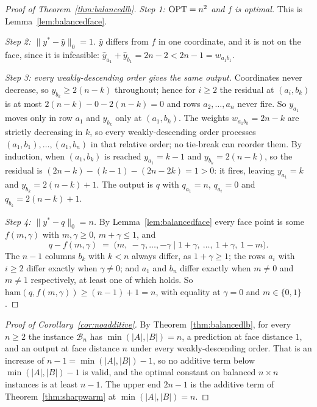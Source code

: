 \begin{proof}[Proof of Theorem~\ref{thm:balancedlb}]
\emph{Step 1: $\mathrm{OPT} = n^2$ and $f$ is optimal.} This is Lemma~\ref{lem:balancedface}.

\emph{Step 2: $\|y^*-\hat y\|_0 = 1$.} $\hat y$ differs from $f$ in one coordinate, and it is not
on the face, since it is infeasible: $\hat y_{a_1} + \hat y_{b_1} = 2n-2 < 2n-1 = w_{a_1 b_1}$.

\emph{Step 3: every weakly-descending order gives the same output.} Coordinates never decrease, so
$y_{b_k} \ge 2(n-k)$ throughout; hence for $i \ge 2$ the residual at $(a_i,b_k)$ is at most
$2(n-k) - 0 - 2(n-k) = 0$ and rows $a_2,\dots,a_n$ never fire. So $y_{a_1}$ moves only in row $a_1$
and $y_{b_k}$ only at $(a_1,b_k)$. The weights $w_{a_1 b_k} = 2n-k$ are strictly decreasing
in $k$, so every weakly-descending order processes $(a_1,b_1),\dots,(a_1,b_n)$ in that relative
order; no tie-break can reorder them. By induction, when $(a_1,b_k)$ is reached $y_{a_1} = k-1$
and $y_{b_k} = 2(n-k)$, so the residual is $(2n-k)-(k-1)-(2n-2k) = 1 > 0$: it fires, leaving
$y_{a_1} = k$ and $y_{b_k} = 2(n-k)+1$. The output is $q$ with $q_{a_1} = n$, $q_{a_i} = 0$ and
$q_{b_k} = 2(n-k)+1$.

\emph{Step 4: $\|y^*-q\|_0 = n$.} By Lemma~\ref{lem:balancedface} every face point is some
$f(m,\gamma)$ with $m, \gamma \ge 0$, $m + \gamma \le 1$, and
\[
  q - f(m,\gamma) \;=\; \bigl(m,\ -\gamma, \dots, -\gamma \;\big|\; 1+\gamma,\ \dots,\ 1+\gamma,\ 1-m\bigr).
\]
The $n-1$ columns $b_k$ with $k < n$ always differ, as $1 + \gamma \ge 1$; the rows $a_i$ with
$i \ge 2$ differ exactly when $\gamma \ne 0$; and $a_1$ and $b_n$ differ exactly when $m \ne 0$ and
$m \ne 1$ respectively, at least one of which holds. So $\mathrm{ham}(q, f(m,\gamma)) \ge (n-1) + 1
= n$, with equality at $\gamma = 0$ and $m \in \{0, 1\}$.
\end{proof}

\begin{proof}[Proof of Corollary~\ref{cor:noadditive}]
By Theorem~\ref{thm:balancedlb}, for every $n \ge 2$ the instance $\mathcal{B}_n$ has
$\min(|A|,|B|) = n$, a prediction at face distance $1$, and an output at face distance $n$ under
every weakly-descending order. That is an increase of $n - 1 = \min(|A|,|B|) - 1$, so no
additive term below $\min(|A|,|B|) - 1$ is valid, and the optimal constant on balanced $n \times n$
instances is at least $n - 1$. The upper end $2n - 1$ is the additive term of
Theorem~\ref{thm:sharpwarm} at $\min(|A|,|B|) = n$.
\end{proof}

